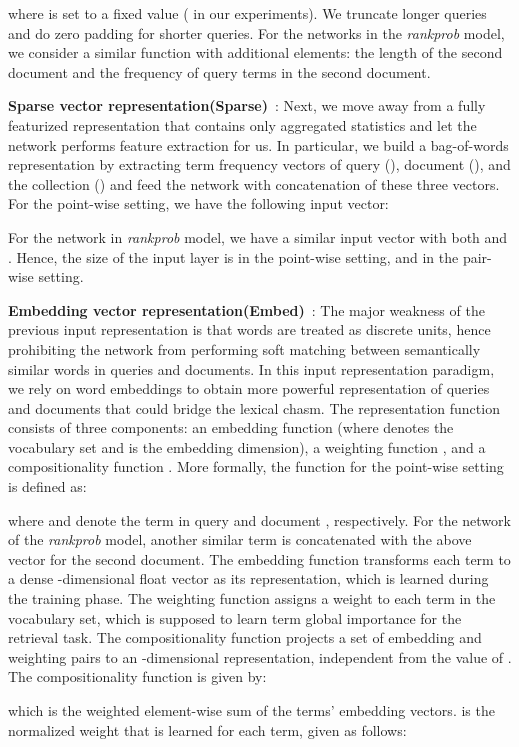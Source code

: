 \documentclass[sigconf]{acmart}
\newcommand{\modelthree}{\textit{rank\-prob} model\xspace}
\newcommand{\Feedtwo}{Sparse vector representation\xspace}
\newcommand{\Feedthree}{Embedding vector representation\xspace}
\newcommand{\ftwo}{Sparse\xspace}
\newcommand{\fthree}{Embed\xspace}
\def\:{\hskip0pt} \newcommand{\mypar}[1]{\vspace*{-0.1ex}\medskip\noindent\textbf{#1}~}
\begin{document}
where  is set to a fixed value ( in our experiments). 
We truncate longer queries and do zero padding for shorter queries. 
For the networks in the \modelthree, we consider a similar function with additional elements: the length of the second document and the frequency of query terms in the second document.



\mypar{\Feedtwo (\ftwo)}: 
Next, we move away from a fully featurized representation that contains only aggregated statistics and let the network performs feature extraction for us. In particular, we build a bag-of-words representation by extracting term frequency vectors of query (), document (), and the collection () and feed the network with concatenation of these three vectors. For the point-wise setting, we have the following input vector:

For the network in \modelthree, we have a similar input vector with both  and . Hence, the size of the input layer is  in the point-wise setting, and  in the pair-wise setting. 


\mypar{\label{sec:feedthree}\Feedthree (\fthree)}:
The major weakness of the previous input representation is that words are treated as discrete units, hence prohibiting the network from  performing soft matching between semantically similar words in queries and documents. In this input representation paradigm, we rely on word embeddings to obtain more powerful representation of queries and documents that could bridge the lexical chasm. The representation function  consists of three components: an embedding function  (where  denotes the vocabulary set and  is the embedding dimension), a weighting function , and a compositionality function . More formally, the function  for the point-wise setting is defined as:

where  and  denote the  term in query  and document , respectively. 
For the network of the \modelthree, another similar term is concatenated with the above vector for the second document. The embedding function  transforms each term to a dense -\:dimensional float vector as its representation, which is learned during the training phase. The weighting function  assigns a weight to each term in the vocabulary set, which is supposed to learn term global importance for the retrieval task. The compositionality function  projects a set of  embedding and weighting pairs to an -\:dimensional representation, independent from the value of . The compositionality function is given by:

which is the weighted element-wise sum of the terms' embedding vectors.  is the normalized weight that is learned for each term, given as follows:
\end{document}
